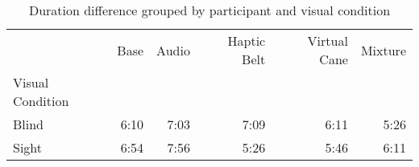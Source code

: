
\begin{table}[!htb]
\centering
\caption{Duration difference grouped by participant and visual condition}
\label{tab:duracao_min_average_group}
\begin{tabular}{lrrrrr}
\toprule
{} &  Base & Audio & Haptic Belt & Virtual Cane & Mixture \\
Visual Condition &       &       &             &              &         \\
\midrule
Blind            &  6:10 &  7:03 &        7:09 &         6:11 &    5:26 \\
Sight            &  6:54 &  7:56 &        5:26 &         5:46 &    6:11 \\
\bottomrule
\end{tabular}
\end{table}

